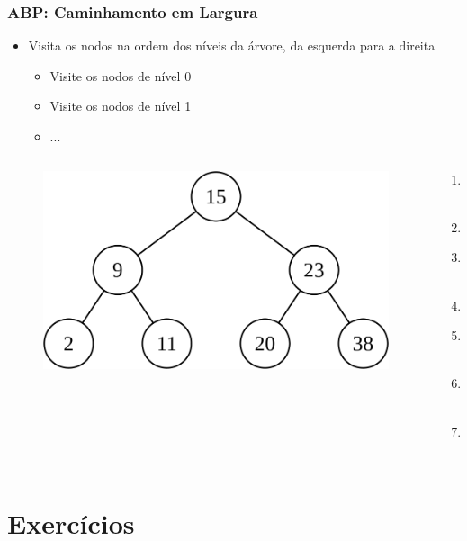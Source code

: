 \documentclass[aspectratio=169]{beamer}
\begin{document}
\begin{frame}\frametitle{ABP: Caminhamento em Largura}
\begin{itemize}
	\item Visita os nodos na ordem dos níveis da árvore, da esquerda para a direita
	\begin{itemize}
		\item Visite os nodos de nível 0
		\item Visite os nodos de nível 1
		\item ...
	\end{itemize}
\end{itemize}
\begin{columns}[T]
\begin{column}{0.7\linewidth}
\begin{figure}[h]
	\centering
	\includegraphics[height=0.3\paperheight]{imagens/abp02.png}
\end{figure}
\end{column}
\begin{column}{0.3\linewidth}
\pause
\begin{enumerate}
	\small
	\item 15
	\item 9
	\item 23
	\item 2
	\item 11
	\item 20
	\item 38
\end{enumerate}
\end{column}
\end{columns}
\end{frame}

\section{Exercícios}
\end{document}
